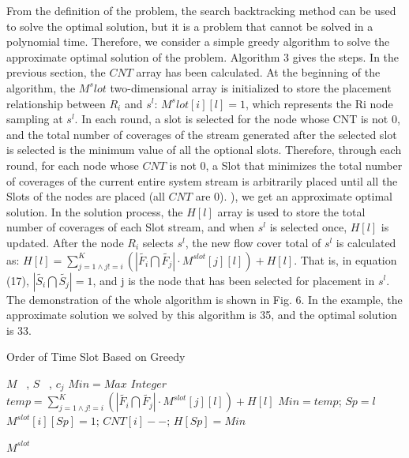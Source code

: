 \documentclass[conference,compsoc]{IEEEtran}
\begin{document}
From the definition of the problem, the search backtracking method can be used to solve the optimal solution, but it is a problem that cannot be solved in a polynomial time. Therefore, we consider a simple greedy algorithm to solve the approximate optimal solution of the problem.
Algorithm 3 gives the steps. In the previous section, the $CNT$ array has been calculated. At the beginning of the algorithm, the $M^slot$ two-dimensional array is initialized to store the placement relationship between $R_i$ and $s^l$: $M^slot[i][l] = 1$, which represents the Ri node sampling at $s^l$. In each round, a slot is selected for the node whose CNT is not 0, and the total number of coverages of the stream generated after the selected slot is selected is the minimum value of all the optional slots. Therefore, through each round, for each node whose $CNT$ is not 0, a Slot that minimizes the total number of coverages of the current entire system stream is arbitrarily placed until all the Slots of the nodes are placed (all $CNT$ are 0). ), we get an approximate optimal solution.
In the solution process, the $H[l]$ array is used to store the total number of coverages of each Slot stream, and when $s^l$ is selected once, $H[l]$ is updated. After the node $R_i$ selects $s^l$, the new flow cover total of $s^l$ is calculated as: $H[l] = \sum^{K}_{j=1 \wedge j != i}(\left| \widetilde{{{F}_{i}}}\bigcap \widetilde{{{F}_{j}}} \right| \cdot M^{slot}[j][l]) + H[l]$. That is, in equation (17), $\left| \widetilde{{{S}_{i}}}\bigcap \widetilde{{{S}_{j}}} \right| = 1$, and j is the node that has been selected for placement in $s^l$. The demonstration of the whole algorithm is shown in Fig. 6. In the example, the approximate solution we solved by this algorithm is 35, and the optimal solution is 33.
\begin{algorithm}[h]
\caption{Order of Time Slot Based on Greedy}
\begin{algorithmic}[1]
\REQUIRE  $M$ ~, $S$ ~, $c_j$
\STATE $Min = Max$ $Integer$
\STATE $temp = \sum^{K}_{j=1 \wedge j != i}(\left| \widetilde{{{F}_{i}}}\bigcap \widetilde{{{F}_{j}}} \right| \cdot M^{slot}[j][l]) + H[l] $
\STATE $Min = temp$; $Sp = l$ 
\ENDIF
\ENDIF
\ENDFOR
\STATE$M^{slot}[i][Sp] = 1$; $ CNT[i]--$; $H[Sp] = Min$
\ENDIF
\ENDFOR
\ENDWHILE

\RETURN $M^{slot}$
\label{code:recentEnd}
\end{algorithmic}
\end{algorithm}
\end{document}
